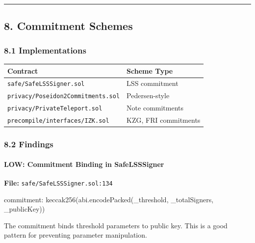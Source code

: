 \documentclass[
]{article}
\newenvironment{Shaded}{}{}
\newcommand{\NormalTok}[1]{#1}
\newcounter{none} %
\begin{document}
\begin{center}\rule{0.5\linewidth}{0.5pt}\end{center}

\subsection{8. Commitment Schemes}\label{8-commitment-schemes}

\subsubsection{8.1 Implementations}\label{81-implementations}

{\def\LTcaptype{none} %
\begin{longtable}[]{@{}ll@{}}
\toprule\noalign{}
Contract & Scheme Type \\
\midrule\noalign{}
\endhead
\bottomrule\noalign{}
\endlastfoot
\texttt{safe/SafeLSSSigner.sol} & LSS commitment \\
\texttt{privacy/Poseidon2Commitments.sol} & Pedersen-style \\
\texttt{privacy/PrivateTeleport.sol} & Note commitments \\
\texttt{precompile/interfaces/IZK.sol} & KZG, FRI commitments \\
\end{longtable}
}

\subsubsection{8.2 Findings}\label{82-findings}

\paragraph{LOW: Commitment Binding in
SafeLSSSigner}\label{low-commitment-binding-in-safelsssigner}

\textbf{File:} \texttt{safe/SafeLSSSigner.sol:134}

\begin{Shaded}
\begin{Highlighting}[]
\NormalTok{commitment: keccak256(abi.encodePacked(\_threshold, \_totalSigners, \_publicKey))}
\end{Highlighting}
\end{Shaded}

The commitment binds threshold parameters to public key. This is a good
pattern for preventing parameter manipulation.
\end{document}
